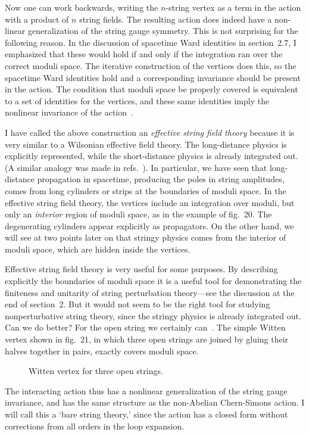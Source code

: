 Now one can work backwards, writing the $n$-string vertex as a term
in the action with a product of $n$ string fields.  The resulting
action does indeed have a non-linear generalization of the string
gauge symmetry.  This is not surprising for the following reason.
In the discussion of spacetime Ward identities in section~2.7,
I emphasized that these would hold if and only if the integration
ran over the correct moduli space.  The iterative construction of the
vertices does this, so the spacetime Ward identities hold and a
corresponding invariance should be present in the action.  The
condition that moduli space be properly covered is equivalent to
a set of identities for the vertices, and these same identities 
imply the nonlinear invariance of the action~\cite{Zsft}.


I have called the above construction an {\it effective string field
theory} because it is very similar to a Wilsonian effective field
theory.  The long-distance physics is explicitly represented, while
the short-distance physics is already integrated out.
(A similar analogy was made in refs.~\cite{BdA}).  In
particular, we have seen that long-distance propagation in
spacetime, producing the poles in string amplitudes, comes from long
cylinders or strips at the boundaries of moduli space.  In the
effective string field theory, the vertices include an integration
over moduli, but only an {\it interior} region of moduli space, as
in the example of fig.~20.  The degenerating cylinders appear
explicitly as propagators. On the other hand, we will see at two
points later on that stringy physics comes from the interior of
moduli space, which  are hidden inside the vertices.

Effective string field theory is very useful for some purposes.
By describing explicitly the boundaries of moduli space it is a
useful tool for demonstrating the finiteness and unitarity of string
perturbation theory---see the discussion at the end of section~2.
But it
would not seem to be the right tool for studying nonperturbative
string theory, since the stringy physics is already integrated out.
Can we do better?  For the open string we
certainly can~\cite{Wsft}.  The simple Witten vertex shown in
fig.~21, in which three open strings are joined by gluing their
halves together in pairs, exactly covers moduli space.
\begin{figure}
\begin{center}
\leavevmode
{}
\end{center}
\caption[]{Witten vertex for three open strings.}
\end{figure}
The interacting action thus has a
nonlinear generalization of the string gauge invariance, and
has the same structure as the non-Abelian Chern-Simons action.
I will call this a `bare string theory,' since the action has a closed
form without corrections from all orders in the loop expansion.

